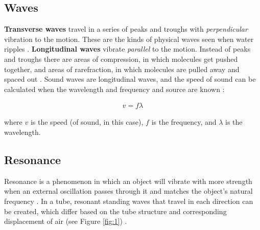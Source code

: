 \documentclass[12pt]{article}
\begin{document}
\subsection{Waves}

\textbf{Transverse waves} travel in a series of peaks and troughs with \textit{perpendicular} vibration to the motion. These are the kinds of physical waves seen when water ripples \cite{waveffden}.
\textbf{Longitudinal waves} vibrate \textit{parallel} to the motion. Instead of peaks and troughs there are areas of compression, in which molecules get pushed together, and
areas of rarefraction, in which molecules are pulled away and spaced out \cite{waveffden,studywave,acousticsound}. Sound waves are longitudinal waves, and the speed of sound can be calculated when the wavelength and frequency and source are known \cite{UCDoscilloscope}:

\vspace{-2ex}
\begin{gather} \label{eq:1}
    v = f \lambda
\end{gather}

where $v$ is the speed (of sound, in this case), $f$ is the frequency, and $\lambda$ is the wavelength.

\subsection{Resonance}

Resonance is a phenomenon in which an object will vibrate with more strength when an external oscillation passes through it and matches the object's natural frequency \cite{resbrit,reslibre}.
In a tube, resonant standing waves that travel in each direction can be created, which differ based on the tube structure and corresponding displacement of air (see Figure \ref{fig:1}) \cite{tuberes}.
\end{document}
